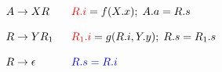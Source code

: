 
\begin{alignat*}{3}
  A &\to XR \quad && \textcolor{red}{R.i} = f(X.x);\; A.a = R.s \\[8pt]
  R &\to YR_{1} && \textcolor{red}{R_{1}.i} = g(R.i, Y.y);\; R.s = R_{1}.s \\[8pt]
  R &\to \epsilon && \textcolor{blue}{R.s = R.i}
\end{alignat*}